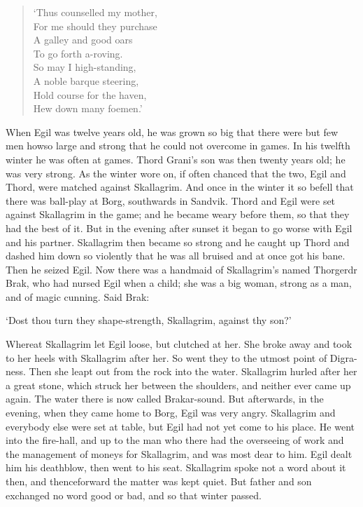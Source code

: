 \begin{verse}
`Thus counselled my mother, \\
For me should they purchase \\
A galley and good oars \\
To go forth a-roving. \\
So may I high-standing, \\
A noble barque steering, \\
Hold course for the haven, \\
Hew down many foemen.' \\
\end{verse}

When Egil was twelve years old, he was grown so big that there were but few men howso large and strong that he could not overcome in games. In his twelfth winter he was often at games. Thord Grani's son was then twenty years old; he was very strong. As the winter wore on, if often chanced that the two, Egil and Thord, were matched against Skallagrim. And once in the winter it so befell that there was ball-play at Borg, southwards in Sandvik. Thord and Egil were set against Skallagrim in the game; and he became weary before them, so that they had the best of it. But in the evening after sunset it began to go worse with Egil and his partner. Skallagrim then became so strong and he caught up Thord and dashed him down so violently that he was all bruised and at once got his bane. Then he seized Egil. Now there was a handmaid of Skallagrim's named Thorgerdr Brak, who had nursed Egil when a child; she was a big woman, strong as a man, and of magic cunning. Said Brak:

`Dost thou turn they shape-strength, Skallagrim, against thy son?'

Whereat Skallagrim let Egil loose, but clutched at her. She broke away and took to her heels with Skallagrim after her. So went they to the utmost point of Digra-ness. Then she leapt out from the rock into the water. Skallagrim hurled after her a great stone, which struck her between the shoulders, and neither ever came up again. The water there is now called Brakar-sound. But afterwards, in the evening, when they came home to Borg, Egil was very angry. Skallagrim and everybody else were set at table, but Egil had not yet come to his place. He went into the fire-hall, and up to the man who there had the overseeing of work and the management of moneys for Skallagrim, and was most dear to him. Egil dealt him his deathblow, then went to his seat. Skallagrim spoke not a word about it then, and thenceforward the matter was kept quiet. But father and son exchanged no word good or bad, and so that winter passed.

